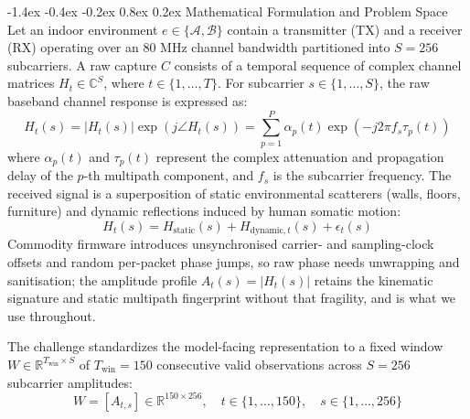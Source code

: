 \documentclass[10pt,a4paper]{article}
\makeatletter
\renewcommand{\subsection}{\@startsection{subsection}{2}{\z@}%
  {-1.4ex \@plus -0.4ex \@minus -0.2ex}%
  {0.8ex \@plus 0.2ex}%
  {\normalfont\normalsize\bfseries\color{secondary}}}
\makeatother
\begin{document}
\subsection{Mathematical Formulation and Problem Space}
Let an indoor environment $e \in \{\mathcal{A}, \mathcal{B}\}$ contain a transmitter (TX) and a receiver (RX) operating over an $80\text{ MHz}$ channel bandwidth partitioned into $S = 256$ subcarriers. A raw capture $C$ consists of a temporal sequence of complex channel matrices $H_t \in \mathbb{C}^{S}$, where $t \in \{1, \dots, T\}$. For subcarrier $s \in \{1, \dots, S\}$, the raw baseband channel response is expressed as:
\begin{equation}
    H_t(s) = |H_t(s)| \exp\left(j \angle H_t(s)\right) = \sum_{p=1}^{P} \alpha_p(t) \exp\left(-j 2\pi f_s \tau_p(t)\right)
\end{equation}
where $\alpha_p(t)$ and $\tau_p(t)$ represent the complex attenuation and propagation delay of the $p$-th multipath component, and $f_s$ is the subcarrier frequency. The received signal is a superposition of static environmental scatterers (walls, floors, furniture) and dynamic reflections induced by human somatic motion:
\begin{equation}
    H_t(s) = H_{\text{static}}(s) + H_{\text{dynamic}, t}(s) + \epsilon_t(s)
\end{equation}
Commodity firmware introduces unsynchronised carrier- and sampling-clock offsets and random per-packet phase jumps, so raw phase needs unwrapping and sanitisation; the amplitude profile $A_t(s) = |H_t(s)|$ retains the kinematic signature and static multipath fingerprint without that fragility, and is what we use throughout.

The challenge standardizes the model-facing representation to a fixed window $W \in \mathbb{R}^{T_{\text{win}} \times S}$ of $T_{\text{win}} = 150$ consecutive valid observations across $S = 256$ subcarrier amplitudes:
\begin{equation}
    W = [A_{t, s}] \in \mathbb{R}^{150 \times 256}, \quad t \in \{1, \dots, 150\}, \quad s \in \{1, \dots, 256\}
\end{equation}
\end{document}
